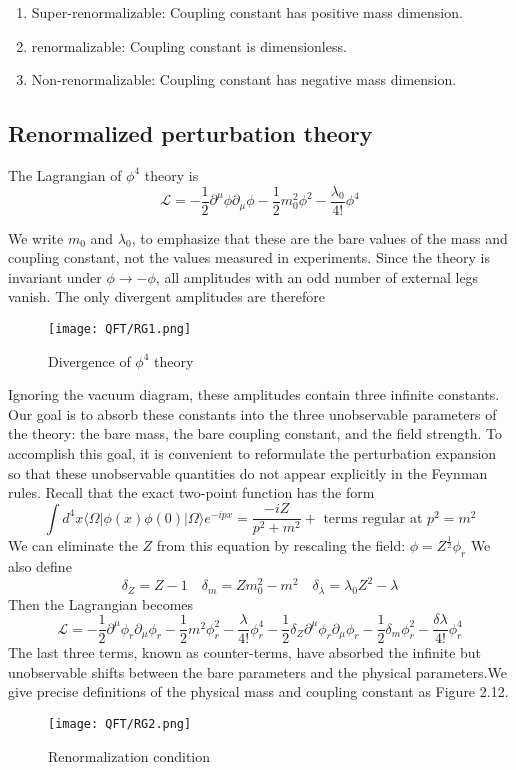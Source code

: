 \begin{enumerate}
\item Super-renormalizable: Coupling constant has positive mass dimension.
\item  renormalizable: Coupling constant is dimensionless.
\item  Non-renormalizable: Coupling constant has negative mass dimension.
\end{enumerate}

\subsection{Renormalized perturbation theory}
The Lagrangian of $\phi^4$ theory is 
\[\mathcal{L} = -\frac{1}{2} \partial^{\mu} \phi \partial_{\mu} \phi -\frac{1}{2}m_0^2 \phi^2 - \frac{\lambda_0}{4!}\phi^4\]

We write $m_0$ and $\lambda_0$, to emphasize that these are the bare values of the mass and coupling constant, not the values measured in experiments.
Since the theory is invariant under $\phi \to -\phi$, all amplitudes with an odd number of external legs vanish. The only divergent amplitudes are therefore
\begin{figure}[!h]
\centering
\texttt{[image: QFT/RG1.png]}
\caption{Divergence of $\phi^4$ theory}
\end{figure}

Ignoring the vacuum diagram, these amplitudes contain three infinite constants. Our goal is to absorb these constants into the three unobservable parameters of the theory: the bare mass, the bare coupling constant, and the field strength. To accomplish this goal, it is convenient to reformulate the perturbation expansion so that these unobservable quantities do not appear
explicitly in the Feynman rules. Recall that the exact two-point function has the form
\[\int d^4x \langle \Omega | \phi(x) \phi(0) | \Omega \rangle e^{-ipx} = \frac{-iZ}{p^2+m^2} + \mbox{ terms regular at } p^2 = m^2\]
We can eliminate the $Z$ from this equation by rescaling the field:
$\phi = Z^{\frac{1}{2}} \phi_r$
We also define
\[\delta_Z = Z -1 \quad \delta_m = Zm_0^2 - m^2 \quad \delta_{\lambda} = \lambda_0 Z^2 - \lambda\]
Then the Lagrangian becomes
\[\mathcal{L} = -\frac{1}{2} \partial^{\mu} \phi_r \partial_{\mu} \phi_r -\frac{1}{2}m^2 \phi_r^2 - \frac{\lambda}{4!}\phi_r^4 -\frac{1}{2} \delta_Z \partial^{\mu} \phi_r \partial_{\mu} \phi_r -\frac{1}{2}\delta_m \phi_r^2 - \frac{\delta \lambda}{4!}\phi_r^4\]
The last three terms, known as counter-terms, have absorbed the infinite but unobservable shifts between the bare parameters and the physical parameters.We give precise definitions of the physical mass and coupling constant as Figure 2.12.\\
\begin{figure}[!h]
\centering
\texttt{[image: QFT/RG2.png]}
\caption{Renormalization condition}
\end{figure}

